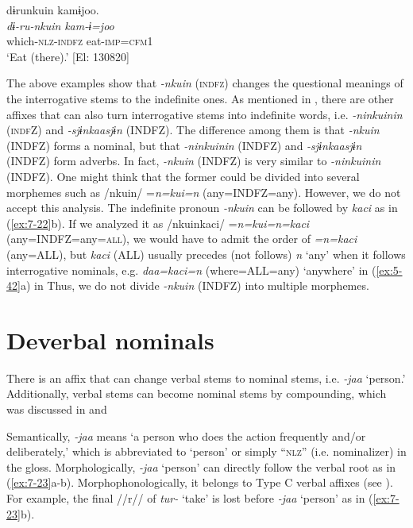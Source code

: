 {\TM}
\glll  dɨrunkuin  kamɨjoo.\\
\textit{dɨ-ru-nkuin}  \textit{kam-ɨ=joo}\\
which-\textsc{nlz}-\textsc{indfz}  eat-\textsc{imp}=\textsc{cfm}1\\
\glt ‘Eat  (there).’ [El: 130820]

\z
\z

The above examples show that \textit{{}-nkuin} (\textsc{indfz}) changes the questional meanings of the interrogative stems to the indefinite ones. As mentioned in , there are other affixes that can also turn interrogative stems into indefinite words, i.e. \textit{{}-ninkuinin} (\textsc{indf}Z) and \textit{{}-sjɨnkaasjɨn} (INDFZ). The difference among them is that \textit{{}-nkuin} (INDFZ) forms a nominal, but that \textit{{}-ninkuinin} (INDFZ) and \textit{{}-sjɨnkaasjɨn} (INDFZ) form adverbs. In fact, \textit{{}-nkuin} (INDFZ) is very similar to \textit{{}-ninkuinin} (INDFZ). One might think that the former could be divided into several morphemes such as /nkuin/ =\textit{n=kui=n} (any=INDFZ=any). However, we do not accept this analysis. The indefinite pronoun \textit{{}-nkuin} can be followed by \textit{kaci} as in (\ref{ex:7-22}b). If we analyzed it as /nkuinkaci/ =\textit{n=kui=n=kaci} (any=INDFZ=any=\textsc{all}), we would have to admit the order of \textit{=n=kaci} (any=ALL), but \textit{kaci} (ALL) usually precedes (not follows) \textit{n} ‘any’ when it follows interrogative nominals, e.g. \textit{daa=kaci=n} (where=ALL=any) ‘anywhere’ in (\ref{ex:5-42}a) in  Thus, we do not divide \textit{{}-nkuin} (INDFZ) into multiple morphemes.

\section{Deverbal nominals}

There is an affix that can change verbal stems to nominal stems, i.e. \textit{{}-jaa} ‘person.’ Additionally, verbal stems can become nominal stems by compounding, which was discussed in  and 

Semantically, \textit{{}-jaa} means ‘a person who does the action frequently and/or deliberately,’ which is abbreviated to ‘person’ or simply “\textsc{nlz}” (i.e. nominalizer) in the gloss. Morphologically, \textit{-jaa} ‘person’ can directly follow the verbal root as in (\ref{ex:7-23}a-b). Morphophonologically, it belongs to Type C verbal affixes (see ). For example, the final //r// of \textit{tur-} ‘take’ is lost before \textit{{}-jaa} ‘person’ as in (\ref{ex:7-23}b).

